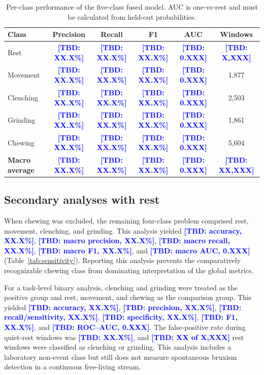 \documentclass[pdflatex,sn-nature,iicol]{sn-jnl}
\newcommand{\TBD}[1]{\textcolor{blue}{\textbf{[TBD: #1]}}}
\begin{document}
\begin{table}[t]
\color{blue}
  \caption{Per-class performance of the five-class fused model. AUC is one-vs-rest and must be calculated from held-out probabilities.}
\color{black}
  \label{tab:perclass}
\color{blue}
  \begin{tabular}{lccccc}
    \toprule
    Class & Precision & Recall & F1 & AUC & Windows \\
    \midrule
    Rest & \TBD{XX.X\%} & \TBD{XX.X\%} & \TBD{XX.X\%} & \TBD{0.XXX} & \TBD{X,XXX} \\
    Movement & \TBD{XX.X\%} & \TBD{XX.X\%} & \TBD{XX.X\%} & \TBD{0.XXX} & 1,877 \\
    Clenching & \TBD{XX.X\%} & \TBD{XX.X\%} & \TBD{XX.X\%} & \TBD{0.XXX} & 2,503 \\
    Grinding & \TBD{XX.X\%} & \TBD{XX.X\%} & \TBD{XX.X\%} & \TBD{0.XXX} & 1,861 \\
    Chewing & \TBD{XX.X\%} & \TBD{XX.X\%} & \TBD{XX.X\%} & \TBD{0.XXX} & 5,604 \\
    \midrule
    \textbf{Macro average} & \TBD{XX.X\%} & \TBD{XX.X\%} & \TBD{XX.X\%} & \TBD{0.XXX} & \TBD{XX,XXX} \\
    \bottomrule
  \end{tabular}
\end{table}

\color{blue}
\subsection{Secondary analyses with rest}

When chewing was excluded, the remaining four-class problem comprised rest, movement, clenching, and grinding. This analysis yielded \TBD{accuracy, XX.X\%}, \TBD{macro precision, XX.X\%}, \TBD{macro recall, XX.X\%}, \TBD{macro F1, XX.X\%}, and \TBD{macro AUC, 0.XXX} (Table~\ref{tab:sensitivity}). Reporting this analysis prevents the comparatively recognizable chewing class from dominating interpretation of the global metrics.

For a task-level binary analysis, clenching and grinding were treated as the positive group and rest, movement, and chewing as the comparison group. This yielded \TBD{accuracy, XX.X\%}, \TBD{precision, XX.X\%}, \TBD{recall/sensitivity, XX.X\%}, \TBD{specificity, XX.X\%}, \TBD{F1, XX.X\%}, and \TBD{ROC--AUC, 0.XXX}. The false-positive rate during quiet-rest windows was \TBD{XX.X\%}, and \TBD{XX of X,XXX} rest windows were classified as clenching or grinding. This analysis includes a laboratory non-event class but still does not measure spontaneous bruxism detection in a continuous free-living stream.
\end{document}
